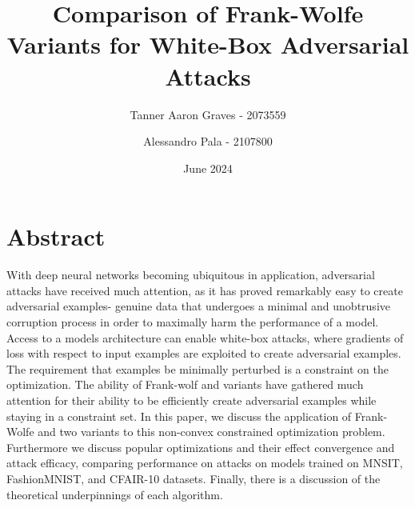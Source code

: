 \documentclass{article}
\title{Comparison of Frank-Wolfe Variants for White-Box Adversarial Attacks}
\author{Tanner Aaron Graves - 2073559\and Alessandro Pala - 2107800}
\date{June 2024}
\begin{document}
\maketitle 
\section{Abstract}
With deep neural networks becoming ubiquitous in application, adversarial attacks have received much attention, as it has proved remarkably easy to create adversarial examples- genuine data that undergoes a minimal and unobtrusive corruption process in order to maximally harm the performance of a model. Access to a models architecture can enable white-box attacks, where gradients of loss with respect to input examples are exploited to create adversarial examples. The requirement that examples be minimally perturbed is a constraint on the optimization. The ability of Frank-wolf and variants have gathered much attention for their ability to be efficiently create adversarial examples while staying in a constraint set. In this paper, we discuss the application of Frank-Wolfe and two variants to this non-convex constrained optimization problem. Furthermore we discuss popular optimizations and their effect convergence and attack efficacy, comparing performance on attacks on models trained on MNSIT, FashionMNIST, and CFAIR-10 datasets. Finally, there is a discussion of the theoretical underpinnings of each algorithm. 
\end{document}
